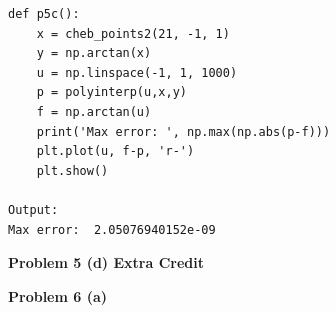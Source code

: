 \documentclass[12pt]{article}
\newcommand{\problem}[1]{\hspace{-4 ex} \large \textbf{Problem #1} }
\begin{document}
	\begin{lstlisting}
def p5c():
	x = cheb_points2(21, -1, 1)
	y = np.arctan(x)
	u = np.linspace(-1, 1, 1000)
	p = polyinterp(u,x,y)
	f = np.arctan(u)
	print('Max error: ', np.max(np.abs(p-f)))
	plt.plot(u, f-p, 'r-')
	plt.show()	
	
Output: 
Max error:  2.05076940152e-09
	\end{lstlisting}

\bigbreak
\problem{5 (d) Extra Credit} 


\bigbreak
\problem{6 (a)} 

		
\end{document}
